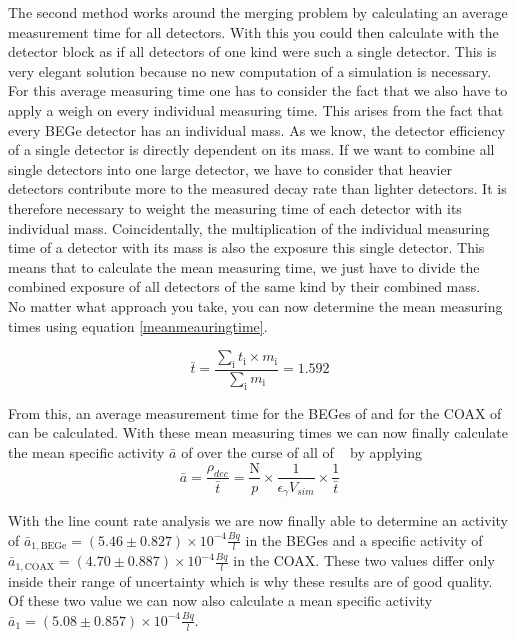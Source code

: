 \documentclass[encoding=utf8,british]{tumphthesis}
\begin{document}
The second method works around the merging problem by calculating an average measurement time for all detectors.
With this you could then calculate with the detector block as if all detectors of one kind were such a single detector.
This is very elegant solution because no new computation of a simulation is necessary.
\\

For this average measuring time one has to consider the fact that we also have to apply a weigh on every individual measuring time.
This arises from the fact that every BEGe detector has an individual mass.
As we know, the detector efficiency of a single detector is directly dependent on its mass.
If we want to combine all single detectors into one large detector, we have to consider that heavier detectors contribute more to the measured decay rate than lighter detectors.
It is therefore necessary to weight the measuring time of each detector with its individual mass.
Coincidentally, the multiplication of the individual measuring time of a detector with its mass is also the exposure this  single detector.
This means that to calculate the mean measuring time, we just have to divide the combined exposure of all detectors of the same kind by their combined mass.
\\

No matter what approach you take, you can now determine the mean measuring times using equation \ref{meanmeauringtime}.

\begin{equation*}
    \bar{t} = \frac{\sum_\mathrm{i} t_\mathrm{i} \times m_\mathrm{i}}{\sum_\mathrm{i} m_\mathrm{i}} = 1.592
\label{meanmeauringtime}
\end{equation*}

From this, an average measurement time for the BEGes of  and for the COAX of can be calculated.
With these mean measuring times we can now finally calculate the mean specific activity $\bar{a}$ of \Kr over the curse of all of \PII~ by applying
\begin{equation*}
    \bar{a} = \frac{\rho_{dec} }{\bar{t}} = \frac{\mathrm{N}}{p}\times\frac{1}{\epsilon_\gamma V_{sim}}\times\frac{1}{\bar{t}}
\end{equation*}


With the line count rate analysis we are now finally able to determine an activity of $\bar{a}_{\mathrm{1,BEGe}} = (5.46\pm0.827)\times10^{-4}	\frac{\unit{Bq}}{\unit{l}}$ in the BEGes and a specific activity of $\bar{a}_{\mathrm{1,COAX}} = (4.70\pm0.887)\times10^{-4}	\frac{\unit{Bq}}{\unit{l}}$ in the COAX.
These two values differ only inside their range of uncertainty which is why these results are of good quality.
Of these two value we can now also calculate a mean specific activity $\bar{a}_{1} = (5.08\pm0.857)\times10^{-4}\frac{\unit{Bq}}{\unit{l}}$.
\\
\end{document}
